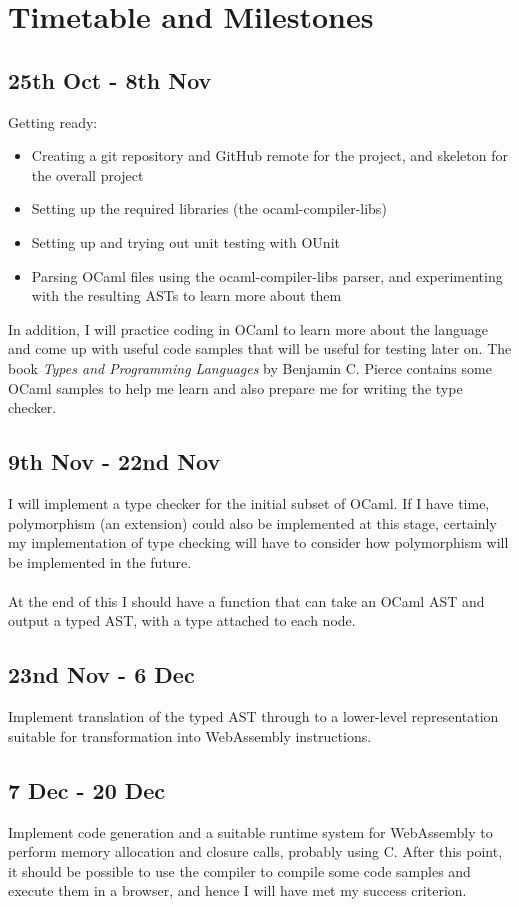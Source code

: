	\section*{Timetable and Milestones}
	
	\subsection*{25th Oct - 8th Nov}
	Getting ready:
	\begin{itemize}
		\item Creating a git repository and GitHub remote for the project, and skeleton for the overall project
		\item Setting up the required libraries (the ocaml-compiler-libs)
		\item Setting up and trying out unit testing with OUnit
		\item Parsing OCaml files using the ocaml-compiler-libs parser, and experimenting with the resulting ASTs to learn more about them 
	\end{itemize}
	In addition, I will practice coding in OCaml to learn more about the language and come up with useful code samples that will be useful for testing later on. The book \textit{Types and Programming Languages} by Benjamin C. Pierce contains some OCaml samples to help me learn and also prepare me for writing the type checker.
	
	\subsection*{9th Nov - 22nd Nov}
	I will implement a type checker for the initial subset of OCaml. If I have time, polymorphism (an extension) could also be implemented at this stage, certainly my implementation of type checking will have to consider how polymorphism will be implemented in the future.
	\\\\
	At the end of this I should have a function that can take an OCaml AST and output a typed AST, with a type attached to each node.
	
	\subsection*{23nd Nov - 6 Dec}
	Implement translation of the typed AST through to a lower-level representation suitable for transformation into WebAssembly instructions.
	
	\subsection*{7 Dec - 20 Dec}
	Implement code generation and a suitable runtime system for WebAssembly to perform memory allocation and closure calls, probably using C. After this point, it should be possible to use the compiler to compile some code samples and execute them in a browser, and hence I will have met my success criterion.
	
